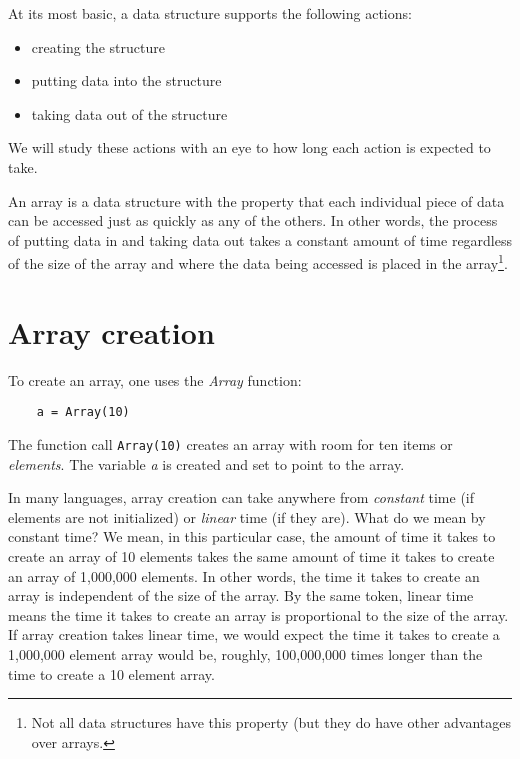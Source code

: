 At its most basic, a data structure supports the following actions:

\begin{itemize}
\item
       creating the structure
\item
       putting data into the structure
\item
       taking data out of the structure
\end{itemize}

We will study these actions with an eye to how long each
action is expected to take.

An array is a data structure with the property that each
individual piece of data can be accessed just as quickly as any of the
others. In other words, the process of putting data in and
taking data out takes a constant amount of time regardless of
the size of the array and where the data being accessed is
placed in the array\footnote{
Not all data structures have this
property (but they do have other advantages over arrays.}.

\section{Array creation}

To create an array, one uses the {\it Array} function:

\begin{verbatim}
    a = Array(10)
\end{verbatim}

The function call \verb!Array(10)!
creates an array with room for ten items or {\it elements}.
The variable {\it a} is created and set to point to
the array.

In many languages, array creation can take anywhere from {\it constant} time
(if elements are not initialized) or {\it linear} time (if they are).
What do we mean by constant time? We mean, in this particular
case, the amount of time it takes to create an array of 10 elements
takes the same amount of time it takes to create an array of 
1,000,000 elements. In other words, the time it takes to create an
array is independent of the size of the array.
By the same token, linear time means the time it takes to create
an array is proportional to the size of the array. If array creation
takes linear time, we would expect the time it takes to create
a 1,000,000 element array would be, roughly, 100,000,000 times
longer than the time to create a 10 element array. 

